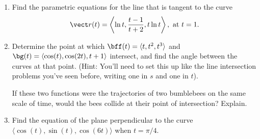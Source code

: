 {\begin{enumerate}
	\item Find the parametric equations for the line that is tangent to the curve \\
	\[\vect r(t)=\left\langle \ln t, \frac{t-1}{t+2}, t \ln t \right\rangle, \text{ at } t = 1.\]
	
	\item Determine the point at which $\bff(t)=\langle t, t^2,t^3\rangle$ and $\bg(t)=\langle \cos(t), \cos(2t), t+1\rangle$ intersect, and find the angle between the curves at that point. (Hint: You'll need to set this up like the line intersection problems you've seen before, writing one in $s$ and one in $t$). 
	
	If these two functions were the trajectories of two bumblebees on the same scale of time, would the bees collide at their point of intersection? Explain.
	
	\item Find the equation of the plane perpendicular to the curve $\langle \cos(t),\sin(t),\cos(6t)\rangle$ when $t=\pi/4$.
\end{enumerate}
}{}

